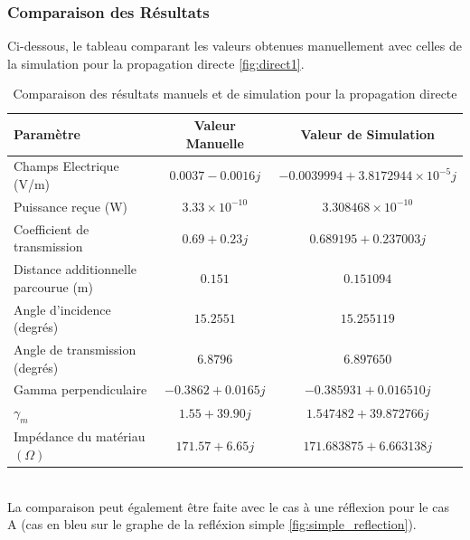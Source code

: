 \subsubsection{Comparaison des Résultats}
Ci-dessous, le tableau comparant les valeurs obtenues manuellement avec celles de la simulation pour la propagation directe \ref{fig:direct1}.
\begin{table}[htbp]
\centering
\caption{Comparaison des résultats manuels et de simulation pour la propagation directe}
\label{tab:comparaison}
\begin{tabular}{@{}lcc@{}}
\toprule
\textbf{Paramètre} & \textbf{Valeur Manuelle} & \textbf{Valeur de Simulation} \\ \midrule
Champs Electrique (V/m) & $0.0037-0.0016j$ & $-0.0039994+3.8172944\times 10^{-5}j$ \\
Puissance reçue (W) &  $3.33 \times 10^{-10}$& $3.308468 \times 10^{-10}$ \\
Coefficient de transmission & $0.69+0.23j$ & $0.689195 + 0.237003j$ \\
Distance additionnelle parcourue (m) & $0.151$ & $0.151094$ \\
Angle d'incidence (degrés) & $15.2551$ & $15.255119$ \\
Angle de transmission (degrés) & $6.8796$ & $6.897650$ \\
Gamma perpendiculaire & $-0.3862+0.0165j$ & $-0.385931 + 0.016510j$ \\
$\gamma_m$ & $1.55+39.90j$ & $1.547482 + 39.872766j$ \\
Impédance du matériau $(\Omega)$ &$171.57+6.65j$& $171.683875 + 6.663138j$ \\
\bottomrule
\end{tabular}
\end{table} \\
La comparaison peut également être faite avec le cas à une réflexion pour le cas A (cas en bleu sur le graphe de la refléxion simple \ref{fig:simple_reflection}).
